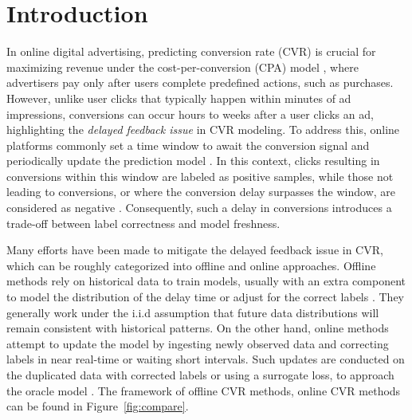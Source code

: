 \section{Introduction}
In online digital advertising, predicting conversion rate (CVR) is crucial for maximizing revenue under the cost-per-conversion (CPA) model \cite{ma2018entire,lu2017practical, lee2012estimating}, where advertisers pay only after users complete predefined actions, such as purchases. However, unlike user clicks that typically happen within minutes of ad impressions, conversions can occur hours to weeks after a user clicks an ad, highlighting the \emph{delayed feedback issue} \cite{chapelle2014modeling,ktena2019addressing,yang2021capturing} in CVR modeling.
To address this, online platforms commonly set a time window to await the conversion signal and periodically update the prediction model \cite{dai2023dually}.
In this context, clicks resulting in conversions within this window are labeled as positive samples, while those not leading to conversions, or where the conversion delay surpasses the window, are considered as negative \cite{guo2022calibrated,ktena2019addressing,li2021follow}.
Consequently, such a delay in conversions introduces a trade-off between label correctness and model freshness.

Many efforts have been made to mitigate the delayed feedback issue in CVR, which can be roughly categorized into offline and online approaches.
Offline methods \cite{yoshikawa2018nonparametric,saito2020dual, yasui2020feedback} rely on historical data to train models, usually with an extra component to model the distribution of the delay time \cite{chapelle2014modeling} or adjust for the correct labels \cite{wang2023unbiased}. They generally work under the i.i.d assumption that future data distributions will remain consistent with historical patterns.
On the other hand, online methods \cite{chen2022asymptotically, gu2021real, li2021follow} attempt to update the model by ingesting newly observed data and correcting labels in near real-time or waiting short intervals. Such updates are conducted on the duplicated data with corrected labels \cite{yang2021capturing} or using a surrogate loss, to approach the oracle model \cite{dai2023dually,ktena2019addressing}. The framework of offline CVR methods, online
CVR methods can be found in Figure~\ref{fig:compare}.


